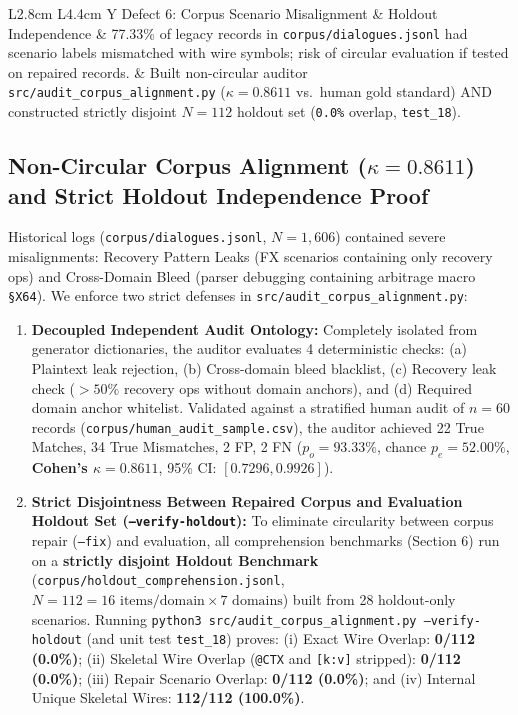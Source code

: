 \documentclass[9pt,a4paper]{extarticle}
\begin{document}
\begin{table}[h!]
\begin{tabularx}{\textwidth}{L{2.8cm} L{4.4cm} Y}
Defect 6: Corpus Scenario Misalignment \& Holdout Independence & 77.33\% of legacy records in \texttt{corpus/\allowbreak dialogues.jsonl} had scenario labels mismatched with wire symbols; risk of circular evaluation if tested on repaired records. & Built non-circular auditor \texttt{src/audit\_\allowbreak corpus\_\allowbreak alignment.py} ($\kappa = 0.8611$ vs.\ human gold standard) AND constructed strictly disjoint $N=112$ holdout set (\texttt{0.0\%} overlap, \texttt{test\_18}). \\
\bottomrule
\end{tabularx}
\end{table}

\subsection{Non-Circular Corpus Alignment ($\kappa = 0.8611$) and Strict Holdout Independence Proof}
Historical logs (\texttt{corpus/dialogues.jsonl}, $N=1{,}606$) contained severe misalignments: Recovery Pattern Leaks (FX scenarios containing only recovery ops) and Cross-Domain Bleed (parser debugging containing arbitrage macro \texttt{\S X64}). We enforce two strict defenses in \texttt{src/audit\_corpus\_alignment.py}:
\begin{enumerate}
  \item \textbf{Decoupled Independent Audit Ontology:} Completely isolated from generator dictionaries, the auditor evaluates 4 deterministic checks: (a) Plaintext leak rejection, (b) Cross-domain bleed blacklist, (c) Recovery leak check ($>50\%$ recovery ops without domain anchors), and (d) Required domain anchor whitelist. Validated against a stratified human audit of $n=60$ records (\texttt{corpus/human\_audit\_sample.csv}), the auditor achieved 22 True Matches, 34 True Mismatches, 2 FP, 2 FN ($p_o = 93.33\%$, chance $p_e = 52.00\%$, \textbf{Cohen's $\kappa = 0.8611$}, 95\% CI: $[0.7296, 0.9926]$).
  \item \textbf{Strict Disjointness Between Repaired Corpus and Evaluation Holdout Set (\texttt{--verify-holdout}):} To eliminate circularity between corpus repair (\texttt{--fix}) and evaluation, all comprehension benchmarks (Section 6) run on a \textbf{strictly disjoint Holdout Benchmark} (\texttt{corpus/holdout\_comprehension.jsonl}, $N = 112 = 16\text{ items/domain} \times 7\text{ domains}$) built from 28 holdout-only scenarios. Running \texttt{python3 src/audit\_corpus\_alignment.py --verify-holdout} (and unit test \texttt{test\_18}) proves: (i) Exact Wire Overlap: \textbf{0/112 (0.0\%)}; (ii) Skeletal Wire Overlap (\texttt{@CTX} and \texttt{[k:v]} stripped): \textbf{0/112 (0.0\%)}; (iii) Repair Scenario Overlap: \textbf{0/112 (0.0\%)}; and (iv) Internal Unique Skeletal Wires: \textbf{112/112 (100.0\%)}.
\end{enumerate}
\end{document}

